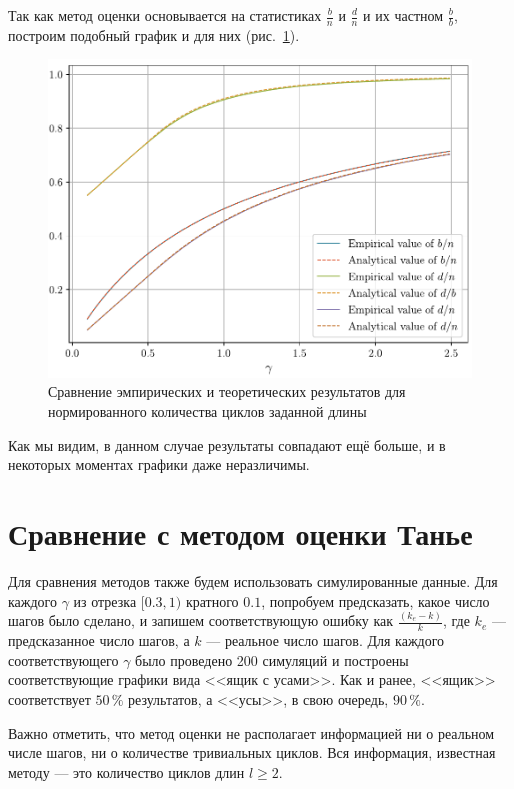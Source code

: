 Так как метод оценки основывается на статистиках $\frac b n$ и $\frac d n$ и их частном  $\frac b b$, построим подобный график и для них (рис.~\ref{d-b-n}).
\begin{figure}[h!]
    \includegraphics[width=0.9\linewidth]{img/d-b-n_1.pdf}
    \caption{Сравнение эмпирических и теоретических результатов для нормированного количества циклов заданной длины}
    \label{d-b-n}
\end{figure}
Как мы видим, в данном случае результаты совпадают ещё больше, и в некоторых моментах графики даже неразличимы.

\section{Сравнение с методом оценки Танье}
Для сравнения методов также будем использовать симулированные данные.
Для каждого $\gamma$ из отрезка $[0.3, 1)$ кратного $0.1$, попробуем предсказать, какое число шагов было сделано, и запишем соответствующую ошибку как $\frac {(k_e - k)} k$, где $k_e$ --- предсказанное число шагов, а $k$ --- реальное число шагов.
Для каждого соответствующего $\gamma$ было проведено 200 симуляций и построены соответствующие графики вида <<ящик с усами>>.
Как и ранее, <<ящик>> соответствует $50 \, \%$ результатов, а <<усы>>, в свою очередь, $90 \, \%$.

Важно отметить, что метод оценки не располагает информацией ни о реальном числе шагов, ни о количестве тривиальных циклов.
Вся информация, известная методу --- это количество циклов длин $l \geq 2$.

